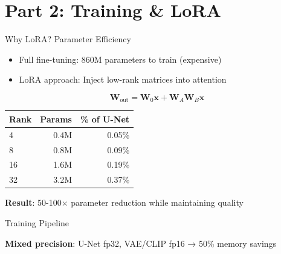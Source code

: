 \documentclass{beamer}
\begin{document}
\section{Part 2: Training \& LoRA}

\begin{frame}{Why LoRA? Parameter Efficiency}
\begin{itemize}
    \item Full fine-tuning: 860M parameters to train (expensive)
    \item LoRA approach: Inject low-rank matrices into attention
\end{itemize}

\begin{equation}
\mathbf{W}_{\text{out}} = \mathbf{W}_0 \mathbf{x} + \mathbf{W}_A \mathbf{W}_B \mathbf{x}
\end{equation}

\begin{table}
\centering
\begin{tabular}{lrr}
\toprule
Rank & Params & \% of U-Net \\
\midrule
4 & 0.4M & 0.05\% \\
8 & 0.8M & 0.09\% \\
16 & 1.6M & 0.19\% \\
32 & 3.2M & 0.37\% \\
\bottomrule
\end{tabular}
\end{table}

\textbf{Result}: 50-100× parameter reduction while maintaining quality
\end{frame}

\begin{frame}{Training Pipeline}
\begin{center}
\end{center}

\vspace{0.3cm}
\textbf{Mixed precision}: U-Net fp32, VAE/CLIP fp16 → 50\% memory savings
\end{frame}
\end{document}
